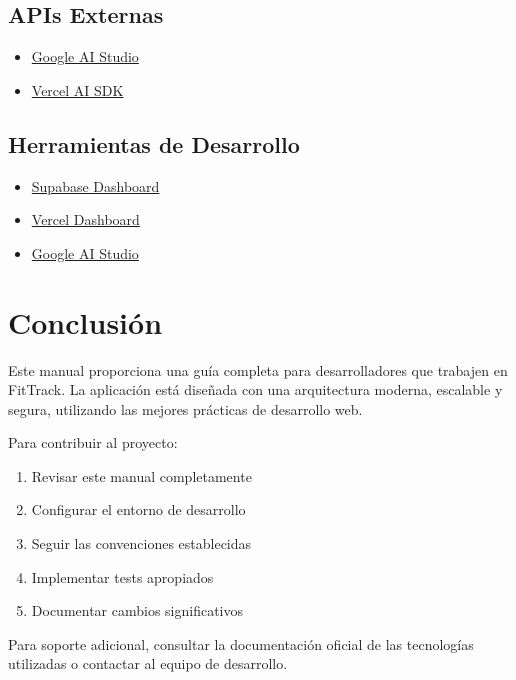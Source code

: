 \documentclass[12pt,a4paper]{article}
\begin{document}
\subsection{APIs Externas}
\begin{itemize}
    \item \href{https://ai.google.dev/}{Google AI Studio}
    \item \href{https://vercel.com/ai}{Vercel AI SDK}
\end{itemize}

\subsection{Herramientas de Desarrollo}
\begin{itemize}
    \item \href{https://supabase.com/dashboard}{Supabase Dashboard}
    \item \href{https://vercel.com/}{Vercel Dashboard}
    \item \href{https://aistudio.google.com/}{Google AI Studio}
\end{itemize}

\section{Conclusión}

Este manual proporciona una guía completa para desarrolladores que trabajen en FitTrack. La aplicación está diseñada con una arquitectura moderna, escalable y segura, utilizando las mejores prácticas de desarrollo web.

Para contribuir al proyecto:
\begin{enumerate}
    \item Revisar este manual completamente
    \item Configurar el entorno de desarrollo
    \item Seguir las convenciones establecidas
    \item Implementar tests apropiados
    \item Documentar cambios significativos
\end{enumerate}

Para soporte adicional, consultar la documentación oficial de las tecnologías utilizadas o contactar al equipo de desarrollo.
\end{document}
